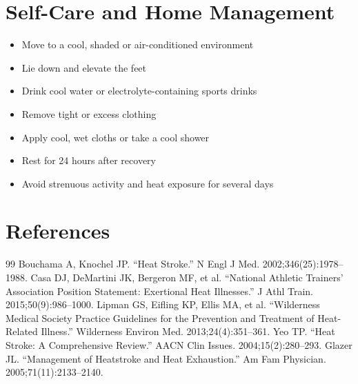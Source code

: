 \section*{Self-Care and Home Management}
\begin{itemize}
\item Move to a cool, shaded or air-conditioned environment
\item Lie down and elevate the feet
\item Drink cool water or electrolyte-containing sports drinks
\item Remove tight or excess clothing
\item Apply cool, wet cloths or take a cool shower
\item Rest for 24 hours after recovery
\item Avoid strenuous activity and heat exposure for several days
\end{itemize}

\section*{References}
\begin{thebibliography}{99}
 Bouchama A, Knochel JP. ``Heat Stroke.'' N Engl J Med. 2002;346(25):1978--1988.
 Casa DJ, DeMartini JK, Bergeron MF, et al. ``National Athletic Trainers' Association Position Statement: Exertional Heat Illnesses.'' J Athl Train. 2015;50(9):986--1000.
 Lipman GS, Eifling KP, Ellis MA, et al. ``Wilderness Medical Society Practice Guidelines for the Prevention and Treatment of Heat-Related Illness.'' Wilderness Environ Med. 2013;24(4):351--361.
 Yeo TP. ``Heat Stroke: A Comprehensive Review.'' AACN Clin Issues. 2004;15(2):280--293.
 Glazer JL. ``Management of Heatstroke and Heat Exhaustion.'' Am Fam Physician. 2005;71(11):2133--2140.
\end{thebibliography}
